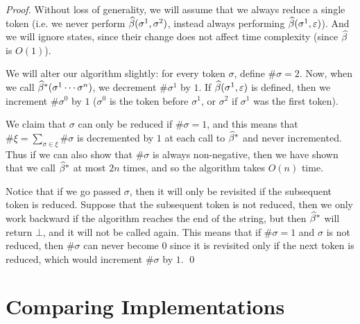 \documentclass{llncs}
\newcounter{algo}
\begin{document}
\begin{proof}

    Without loss of generality, we will assume that we always reduce a single token (i.e. we never perform
    $\widehat\beta(\sigma^1,\sigma^2)$, instead always performing $\widehat\beta(\sigma^1,\varepsilon)$).
    And we will ignore states, since their change does not affect time complexity (since $\widehat\beta$ is $O(1)$).

    We will alter our algorithm slightly: for every token $\sigma$, define $\#\sigma=2$.
    Now, when we call $\widehat\beta^*(\sigma^1\cdots\sigma^n)$, we decrement $\#\sigma^1$ by $1$.
    If $\widehat\beta(\sigma^1,\varepsilon)$ is defined, then we increment $\#\sigma^0$ by $1$ ($\sigma^0$ is the token
    before $\sigma^1$, or $\sigma^2$ if $\sigma^1$ was the first token).

    We claim that $\sigma$ can only be reduced if $\#\sigma=1$, and this means that $\#\xi=\sum_{\sigma\in\xi}\#\sigma$ is
    decremented by $1$ at each call to $\widehat\beta^*$ and never incremented.
    Thus if we can also show that $\#\sigma$ is always non-negative, then we have shown that we call $\widehat\beta^*$ at most $2n$ times,
    and so the algorithm takes $O(n)$ time.

    Notice that if we go passed $\sigma$, then it will only be revisited if the subsequent token is reduced.
    Suppose that the subsequent token is not reduced, then we only work backward if the algorithm reaches the end of the string,
    but then $\widehat\beta^*$ will return $\bot$, and it will not be called again.
    This means that if $\#\sigma=1$ and $\sigma$ is not reduced, then $\#\sigma$ can never become $0$ since it is revisited only if
    the next token is reduced, which would increment $\#\sigma$ by $1$.
    \qed

\end{proof}

\section{Comparing Implementations}
\end{document}
